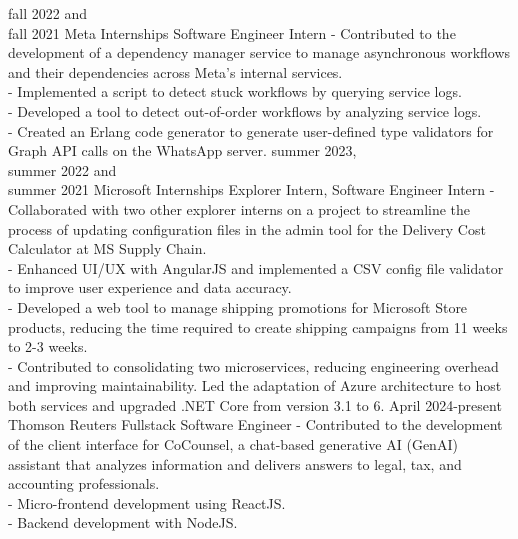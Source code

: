 \documentclass[9pt]{developercv} %
\begin{document}
\begin{entrylist}
    \entry
        {fall 2022 and\\fall 2021}
        {Meta Internships}
        {Software Engineer Intern}
        {
			- Contributed to the development of a dependency manager service to manage asynchronous workflows and their dependencies across Meta’s internal services.\\
			- Implemented a script to detect stuck workflows by querying service logs.\\
			- Developed a tool to detect out-of-order workflows by analyzing service logs.\\
			- Created an Erlang code generator to generate user-defined type validators for Graph API calls on the WhatsApp server.
		}
	\entry
		{summer 2023,\\summer 2022 and\\summer 2021}
		{Microsoft Internships}
		{Explorer Intern, Software Engineer Intern}
		{
			- Collaborated with two other explorer interns on a project to streamline the process of updating configuration files in the admin tool for the Delivery Cost Calculator at MS Supply Chain.\\
			- Enhanced UI/UX with AngularJS and implemented a CSV config file validator to improve user experience and data accuracy.\\
			- Developed a web tool to manage shipping promotions for Microsoft Store products, reducing the time required to create shipping campaigns from 11 weeks to 2-3 weeks.\\
			- Contributed to consolidating two microservices, reducing engineering overhead and improving maintainability. Led the adaptation of Azure architecture to host both services and upgraded .NET Core from version 3.1 to 6.
	}
	\entry
		{April 2024-present}
		{Thomson Reuters}
		{Fullstack Software Engineer}
		{
			- Contributed to the development of the client interface for CoCounsel, a chat-based generative AI (GenAI) assistant that analyzes information and delivers answers to legal, tax, and accounting professionals.\\
			- Micro-frontend development using ReactJS.\\
			- Backend development with NodeJS.
		}
\end{entrylist}

\end{document}
